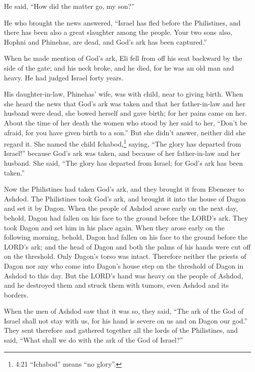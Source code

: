 He said, “How did the matter go, my son?”

\myverse{}He who brought the news answered, “Israel has fled before the
Philistines, and there has been also a great slaughter among the people. Your two sons also, Hophni and
Phinehas, are dead, and God’s ark has been captured.”

\myverse{}When he made mention of God’s ark, Eli fell from off his seat
backward by the side of the gate; and his neck broke, and he died, for he was an old man and heavy. He
had judged Israel forty years.

\myverse{}His daughter-in-law, Phinehas’ wife, was with child, near to
giving birth. When she heard the news that God’s ark was taken and that her father-in-law and her husband
were dead, she bowed herself and gave birth; for her pains came on her.
\myverse{}About the time of her death the women who stood by her said to her, “Don’t
be afraid, for you have given birth to a son.” But she didn’t answer, neither did she regard it.
\myverse{}She named the child Ichabod,\footnote{4:21 “Ichabod” means “no glory”.} saying, “The glory has departed from Israel!” because God’s
ark was taken, and because of her father-in-law and her husband.
\myverse{}She said, “The glory has departed from Israel; for God’s ark has been taken.”


\mychapter{} \myverse*{}Now the Philistines had taken God’s ark, and they brought it from
Ebenezer to Ashdod.
\myverse{}The Philistines took God’s ark, and brought it into the house of Dagon and set
it by Dagon.
\myverse{}When the people of Ashdod arose early on the next day, behold, Dagon had fallen
on his face to the ground before the LORD’s ark. They took Dagon and set him in his place again.
\myverse{}When they arose early on the following morning, behold, Dagon had fallen on
his face to the ground before the LORD’s ark; and the head of Dagon and both the palms of his hands were
cut off on the threshold. Only Dagon’s torso was intact.
\myverse{}Therefore neither the priests of Dagon nor any who come into Dagon’s house step
on the threshold of Dagon in Ashdod to this day.
\myverse{}But the LORD’s hand was heavy on the people of Ashdod, and he destroyed them
and struck them with tumors, even Ashdod and its borders.

\myverse{}When the men of Ashdod saw that it was so, they said, “The ark
of the God of Israel shall not stay with us, for his hand is severe on us and on Dagon our god.”
\myverse{}They sent therefore and gathered together all the lords of the Philistines,
and said, “What shall we do with the ark of the God of Israel?”

